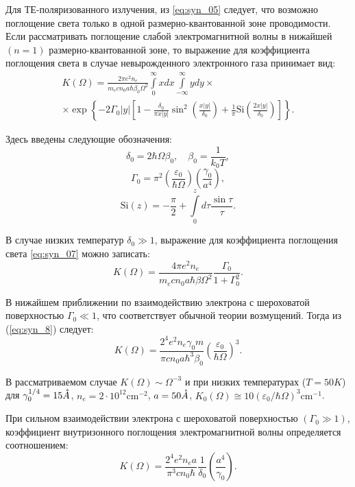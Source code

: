 Для ТЕ-поляризованного излучения, из \eqref{eq:syn_05} следует, что  возможно поглощение света только в одной размерно-квантованной зоне проводимости. Если рассматривать поглощение слабой электромагнитной волны в нижайшей $(n=1)$ размерно-квантованной зоне, то выражение для коэффициента поглощения света в случае невырожденного электронного газа принимает вид:
\begin{multline} \label{eq:syn_07}
K(\Omega) = \frac{2 \pi e^2 n_e }{m_e c n_0 a \hbar \beta_0 \Omega^2} \int\limits_0^{\infty}x dx \int\limits_{-\infty}^{\infty}y dy \times \\
\times \exp{\left\lbrace  - 2\Gamma_0 |y| \left[ 1 - \frac{\delta_0}{\pi x |y|}\sin^2{\left( \frac{x|y|}{\delta_0}\right) } + \frac{1}{\pi} \mathrm{Si}{\left( \frac{2x|y|}{\delta_0}\right) } \right]  \right\rbrace   }.
\end{multline} 

Здесь введены следующие обозначения:
\[
\delta_0 = 2\hbar \Omega \beta_0, \quad \beta_0 = \frac{1}{k_0 T},
\]
\[
\Gamma_0 = \pi^2 \left(\frac{\varepsilon_0}{\hbar \Omega} \right) \left( \frac{\gamma_0}{a^4} \right),
\]
\[
\mathrm{Si}(z) = -\frac{\pi}{2} + \int\limits_0^z{d\tau\frac{\sin{\tau}}{\tau}}.
\]

В случае низких температур $\delta_0 \gg 1$, выражение для коэффициента поглощения света \eqref{eq:syn_07} можно записать:
\begin{equation} \label{eq:syn_8}
K(\Omega )=\frac{4\pi e^{2} n_{e} }{m_e c n_0 a \hbar\beta \Omega^2 } \frac{\Gamma_0 }{1+\Gamma_0^2 }.
\end{equation} 

В нижайшем приближении по взаимодействию электрона с шероховатой поверхностью $\Gamma_0 \ll 1$, что соответствует обычной теории возмущений. Тогда из (\ref{eq:syn_8}) следует:
\begin{equation} \label{eq:syn_9}
K(\Omega )=\frac{2^4 e^2 n_e \gamma_0 m}{\pi c n_0 a\hbar^3 \beta_0 } \left(\frac{\varepsilon_0 }{\hbar\Omega } \right)^3.
\end{equation} 

В рассматриваемом случае $K(\Omega )\sim \Omega^{-3} $ и при низких температурах ($T=50 K$) для $\gamma_0^{1/4} =15 \AA$, $n_e = 2\cdot 10^{12} \text{cm}^{-2} $, $a=50 \AA$, $K_0 (\Omega )\cong 10\left(\varepsilon_0 / \hbar\Omega \right)^3 \text{cm}^{-1} $.

При сильном взаимодействии электрона с шероховатой поверхностью $\left( \Gamma_0 \gg 1 \right) $, коэффициент внутризонного поглощения электромагнитной волны определяется соотношением:
\begin{equation} \label{eq:syn_10}
K(\Omega )=\frac{2^4 e^2 n_e a}{\pi^3 cn_0 \hbar } \frac{1}{\delta_0 } \left(\frac{a^4 }{\gamma_0 } \right).
\end{equation} 

